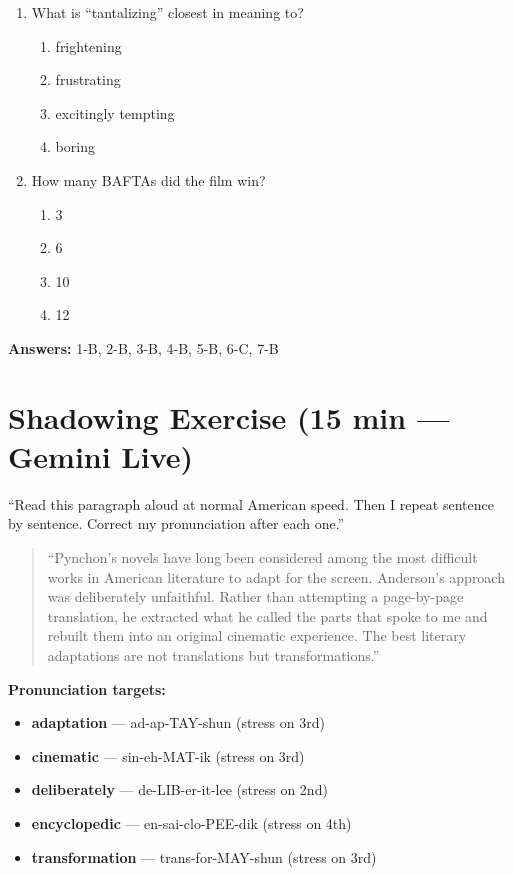 \documentclass[10pt,a4paper]{article}
\begin{document}
\begin{enumerate}[label=\textbf{\arabic*.}]
\item What is ``tantalizing'' closest in meaning to?
\begin{enumerate}[label=(\Alph*)]
\item frightening \item frustrating
\item excitingly tempting \item boring
\end{enumerate}

\item How many BAFTAs did the film win?
\begin{enumerate}[label=(\Alph*)]
\item 3 \item 6 \item 10 \item 12
\end{enumerate}
\end{enumerate}

\textbf{Answers:} 1-B, 2-B, 3-B, 4-B, 5-B, 6-C, 7-B

\section*{Shadowing Exercise (15 min --- Gemini Live)}

\begin{tcolorbox}[colback=white, colframe=black,
    title=Tell Gemini Live:]
``Read this paragraph aloud at normal American speed. Then I repeat
sentence by sentence. Correct my pronunciation after each one.''
\end{tcolorbox}

\begin{quote}\small
``Pynchon's novels have long been considered among the most
difficult works in American literature to adapt for the screen.
Anderson's approach was deliberately unfaithful. Rather than
attempting a page-by-page translation, he extracted what he called
the parts that spoke to me and rebuilt them into an original
cinematic experience. The best literary adaptations are not
translations but transformations.''
\end{quote}

\textbf{Pronunciation targets:}
\begin{itemize}[nosep]
\item \textbf{adaptation} --- ad-ap-TAY-shun (stress on 3rd)
\item \textbf{cinematic} --- sin-eh-MAT-ik (stress on 3rd)
\item \textbf{deliberately} --- de-LIB-er-it-lee (stress on 2nd)
\item \textbf{encyclopedic} --- en-sai-clo-PEE-dik (stress on 4th)
\item \textbf{transformation} --- trans-for-MAY-shun (stress on 3rd)
\end{itemize}
\end{document}
